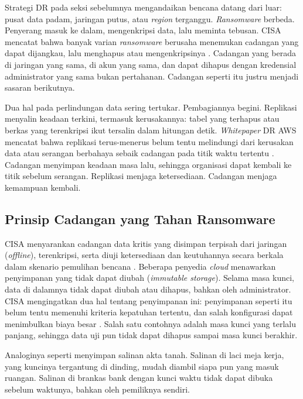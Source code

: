 Strategi DR pada seksi sebelumnya mengandaikan bencana datang dari luar: pusat data padam, jaringan
putus, atau \textit{region} terganggu. \textit{Ransomware} berbeda. Penyerang masuk ke dalam,
mengenkripsi data, lalu meminta tebusan. CISA mencatat bahwa banyak varian \textit{ransomware}
berusaha menemukan cadangan yang dapat dijangkau, lalu menghapus atau mengenkripsinya
\cite{c12-cisa2023}. Cadangan yang berada di jaringan yang sama, di akun yang sama, dan dapat
dihapus dengan kredensial administrator yang sama bukan pertahanan. Cadangan seperti itu justru
menjadi sasaran berikutnya.

Dua hal pada perlindungan data sering tertukar. Pembagiannya begini. Replikasi menyalin keadaan
terkini, termasuk kerusakannya: tabel yang terhapus atau berkas yang terenkripsi ikut tersalin
dalam hitungan detik. \textit{Whitepaper} DR AWS mencatat bahwa replikasi terus-menerus belum tentu
melindungi dari kerusakan data atau serangan berbahaya sebaik cadangan pada titik waktu tertentu
\cite{c12-aws-dr2021}. Cadangan menyimpan keadaan masa lalu, sehingga organisasi dapat kembali ke
titik sebelum serangan. Replikasi menjaga ketersediaan. Cadangan menjaga kemampuan kembali.

\subsection{Prinsip Cadangan yang Tahan Ransomware}

CISA menyarankan cadangan data kritis yang disimpan terpisah dari jaringan (\textit{offline}),
terenkripsi, serta diuji ketersediaan dan keutuhannya secara berkala dalam skenario pemulihan
bencana \cite{c12-cisa2023}. Beberapa penyedia \textit{cloud} menawarkan penyimpanan yang tidak
dapat diubah (\textit{immutable storage}). Selama masa kunci, data di dalamnya tidak dapat diubah
atau dihapus, bahkan oleh administrator. CISA mengingatkan dua hal tentang penyimpanan ini:
penyimpanan seperti itu belum tentu memenuhi kriteria kepatuhan tertentu, dan salah konfigurasi
dapat menimbulkan biaya besar \cite{c12-cisa2023}. Salah satu contohnya adalah masa kunci yang
terlalu panjang, sehingga data uji pun tidak dapat dihapus sampai masa kunci berakhir.

Analoginya seperti menyimpan salinan akta tanah. Salinan di laci meja kerja, yang kuncinya
tergantung di dinding, mudah diambil siapa pun yang masuk ruangan. Salinan di brankas bank dengan
kunci waktu tidak dapat dibuka sebelum waktunya, bahkan oleh pemiliknya sendiri.

